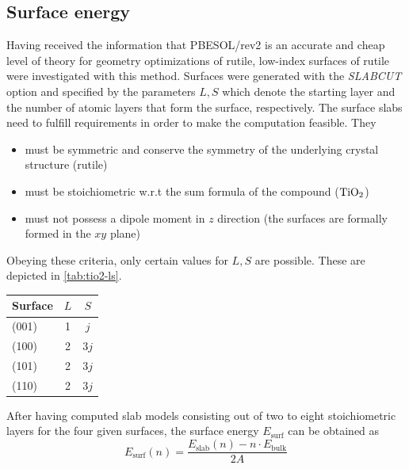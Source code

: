 \documentclass[a4paper,12pt,parskip=half]{scrartcl}
\begin{document}
\subsection{Surface energy}
%
Having received the information that PBESOL/rev2 is an accurate and cheap level of theory for geometry optimizations of rutile, low-index surfaces of rutile were investigated with this method. Surfaces were generated with the \textit{SLABCUT} option and specified by the parameters $ L, S $ which denote the starting layer and the number of atomic layers that form the surface, respectively. The surface slabs need to fulfill requirements in order to make the computation feasible. They
%
\begin{itemize}
	\item must be symmetric and conserve the symmetry of the underlying crystal structure (rutile)
	\item must be stoichiometric w.r.t the sum formula of the compound ($ \ce{TiO2} $)
	\item must not possess a dipole moment in $ z $ direction (the surfaces are formally formed in the $ xy $ plane)
\end{itemize}
%
Obeying these criteria, only certain values for $ L, S $ are possible. These are depicted in \autoref{tab:tio2-ls}.
%
\begin{table}
	\centering
	\label{tab:tio2-ls}
	\begin{tabular}{lcc}
		\toprule
		Surface & $ L $ & $ S $ \\
		\midrule
		(001)   & 1     & $j$   \\
		(100)   & 2     & $3j$  \\
		(101)   & 2     & $3j$  \\
		(110)   & 2     & $3j$  \\
		\bottomrule
	\end{tabular}
\end{table}
%
After having computed slab models consisting out of two to eight stoichiometric layers for the four given surfaces, the surface energy $ E_\mathrm{surf} $ can be obtained as
%
\begin{equation}
	E_\mathrm{surf} (n) = \frac{E_\mathrm{slab}(n) - n \cdot E_\mathrm{bulk}}{2A}
\end{equation}
%
\end{document}

